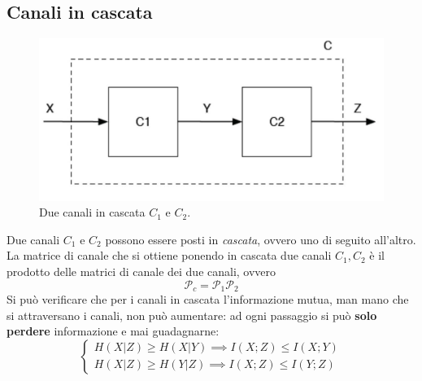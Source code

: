 \subsection{Canali in cascata}
\begin{figure}[H]
    \centering
    \includegraphics[scale=0.2]{img/cascata.jpg}
    \caption{Due canali in cascata $C_1$ e $C_2$.}
\end{figure}
Due canali $C_1$ e $C_2$ possono essere posti in \textit{cascata}, ovvero uno di seguito all'altro. La matrice di
canale che si ottiene ponendo in cascata due canali $C_1, C_2$ è il prodotto delle matrici di canale dei due canali, ovvero
\begin{equation}
    \mathcal{P}_c = \mathcal{P}_1 \mathcal{P}_2
\end{equation}
Si può verificare che per i canali in cascata l'informazione mutua, man mano che si attraversano i canali, non può aumentare: ad ogni passaggio si può \textbf{solo perdere} informazione e mai guadagnarne:
\begin{equation*}
    \begin{cases}
    H(X|Z) \geq H(X|Y) \implies I(X;Z) \leq I(X;Y)\\
    H(X|Z) \geq H(Y|Z) \implies I(X;Z) \leq I(Y;Z)
    \end{cases}
\end{equation*}
